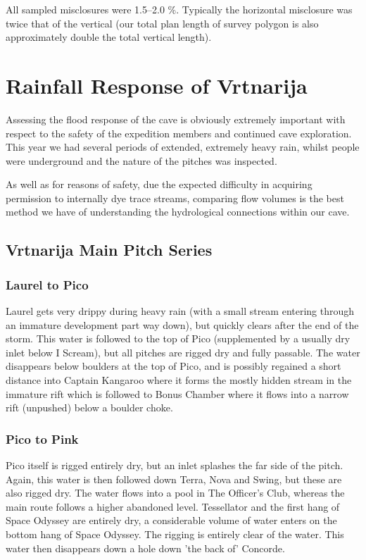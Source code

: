 \documentclass[english,a4]{article}
\begin{document}
All sampled misclosures were 1.5--2.0 \%. Typically the horizontal misclosure
was twice that of the vertical (our total plan length of survey polygon is also
approximately double the total vertical length).



\section{Rainfall Response of Vrtnarija}

Assessing the flood response of the cave is obviously extremely important
with respect to the safety of the expedition members and continued
cave exploration. This year we had several periods of extended, extremely
heavy rain, whilst people were underground and the nature of the pitches
was inspected.

As well as for reasons of safety, due the expected difficulty in acquiring
permission to internally dye trace streams, comparing flow volumes
is the best method we have of understanding the hydrological connections
within our cave.

\subsection{Vrtnarija Main Pitch Series}

\subsubsection{Laurel to Pico}

Laurel gets very drippy during heavy rain (with a small stream entering through
an immature development part way down), but quickly clears after the end of the
storm. This water is followed to the top of Pico (supplemented by a usually dry
inlet below I Scream), but all pitches are rigged dry and fully passable. 
The water disappears below boulders at the top of Pico, and is possibly
regained a short distance into Captain Kangaroo where it forms the mostly
hidden stream in the immature rift which is followed to Bonus Chamber where it
flows into a narrow rift (unpushed) below a boulder choke.

\subsubsection{Pico to Pink}

Pico itself is rigged entirely dry, but an inlet splashes the far side of the
pitch. Again, this water is then followed down Terra, Nova and Swing, but these
are also rigged dry. The water flows into a pool in The Officer's Club, whereas
the main route follows a higher abandoned level. Tessellator and the first hang
of Space Odyssey are entirely dry, a considerable volume of water enters on the
bottom hang of Space Odyssey. The rigging is entirely clear of the
water. This water then disappears down a hole down 'the back of' Concorde.
\end{document}
